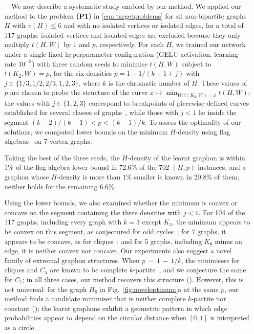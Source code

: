 \documentclass{article}
\theoremstyle{plain}
\theoremstyle{definition}
\theoremstyle{remark}
\begin{document}
\ $\,$
We now describe a systematic study enabled by our method.
We applied our method to the problem \textbf{(P1)} in \eqref{eqn:targetproblems} for all non-bipartite graphs $H$ with $v(H) \le 6$ and with no isolated vertices or isolated edges, for a total of 117 graphs; isolated vertices and isolated edges are excluded because they only multiply $t(H, W)$ by $1$ and $p$, respectively.
For each $H$, we trained our network under a single fixed hyperparameter configuration (GELU activation, learning rate $10^{-3}$) with three random seeds to minimise $t(H,W)$ subject to $t(K_2,W)=p$, for the six densities $p = 1 - 1/(k-1+j)$ with $j \in \{1/3, 1/2, 2/3, 1, 2, 3\}$, where $k$ is the chromatic number of $H$.
These values of $p$ are chosen to probe the structure of the curve
$x \mapsto \min_{W:t(K_2,W)=x} t(H,W)$:
the values with $j \in \{1, 2, 3\}$ correspond to breakpoints of piecewise-defined curves established for several classes of graphs~\citep{razborov2008minimal,reiher2016clique,bennett2020minimizing}, while those with $j < 1$ lie inside the segment $(k-2)/(k-1) < p < (k-1)/k$.
To assess the optimality of our solutions, we computed lower bounds on the minimum $H$-density using flag algebras~\citep{razborov2007flag} on $7$-vertex graphs.

Taking the best of the three seeds, the $H$-density of the learnt graphon is within $1\%$ of the flag-algebra lower bound in 72.6\% of the 702 $(H,p)$ instances, and a graphon whose $H$-density is more than $1\%$ smaller is known in 20.8\% of them; neither holds for the remaining 6.6\%.

Using the lower bounds, we also examined whether the minimum is convex or concave on the segment containing the three densities with $j < 1$. For 104 of the 117 graphs, including every graph with $k = 3$ except $K_3$, the minimum appears to be convex on this segment, as conjectured for odd cycles~\citep{bennett2020minimizing}; for 7 graphs, it appears to be concave, as for cliques~\citep{reiher2016clique}; and for 5 graphs, including $K_6$ minus an edge, it is neither convex nor concave.
%
Our experiments also suggest a novel family of extremal graphon structures. When $p \,{=}\, 1 \,{-}\, 1/k$, the minimisers for cliques and $C_5$ are known to be complete $k$-partite~\citep{reiher2016clique,bennett2020minimizing}, and we conjecture the same for $C_7$; in all three cases, our method recovers this structure (). However, this is not universal: for the graph $H_6$ in Fig.~\ref{fig:noveloptimum}a at the same $p$, our method finds a candidate minimiser that is neither complete $k$-partite nor constant (); the learnt graphons exhibit a geometric pattern in which edge probabilities appear to depend on the circular distance when $[0,1]$ is interpreted as a circle.
\end{document}
